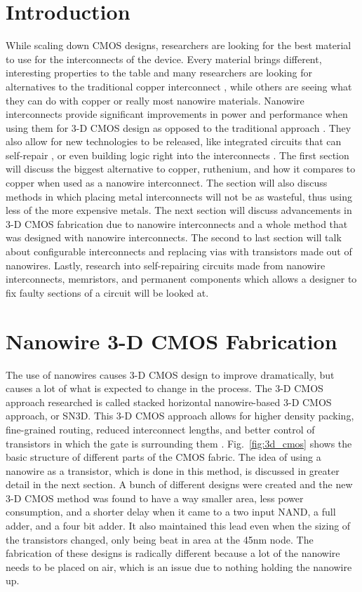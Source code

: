 \documentclass[conference]{IEEEtran}
\begin{document}
\section{Introduction}
While scaling down CMOS designs, researchers are looking for the best material to use for the interconnects of the device.
Every material brings different, interesting properties to the table and many researchers are looking for alternatives to the
traditional copper interconnect \cite{7968937}, while others are seeing what they can do with copper or really most nanowire
materials. Nanowire interconnects provide significant improvements in power and performance when using them for 3-D CMOS
design as opposed to the traditional approach \cite{8387522}. They also allow for new technologies to be released, like
integrated circuits that can self-repair \cite{8423678}, or even building logic right into the interconnects \cite{5510748}. The first
section will discuss the biggest alternative to copper, ruthenium, and how it compares to copper when used as a nanowire
interconnect. The section will also discuss methods in which placing metal interconnects will not be as wasteful, thus
using less of the more expensive metals. The next section will discuss
advancements in 3-D CMOS fabrication due to nanowire interconnects and a whole method that was designed with nanowire
interconnects. The second to last section will talk about configurable interconnects and replacing vias with transistors
made out of nanowires. Lastly, research into self-repairing circuits made from nanowire interconnects, memristors, and
permanent components which allows a designer to fix faulty sections of a circuit will be looked at.

\enlargethispage{-10cm}
\section{Nanowire 3-D CMOS Fabrication}
The use of nanowires causes 3-D CMOS design to improve dramatically, but causes a lot of what is expected to change in the process.
The 3-D CMOS approach researched is called stacked horizontal nanowire-based 3-D CMOS approach, or SN3D. This 3-D CMOS approach
allows for higher density packing, fine-grained routing, reduced interconnect lengths, and better control of transistors in which
the gate is surrounding them \cite{8387522}. Fig.~\ref{fig:3d_cmos} shows the basic structure of different parts of the CMOS fabric.
The idea of using a nanowire as a transistor, which is done in this method, is discussed in greater detail in the next section.
A bunch of different designs were created and the new 3-D CMOS method was found to have a way smaller area, less power consumption,
and a shorter delay when it came to a two input NAND, a full adder, and a four bit adder. It also maintained this lead even when 
the sizing of the transistors changed, only being beat in area at the 45nm node. 
The fabrication of these designs is radically different because a lot of the nanowire needs to be placed on air, which is an issue
due to nothing holding the nanowire up.
\end{document}
